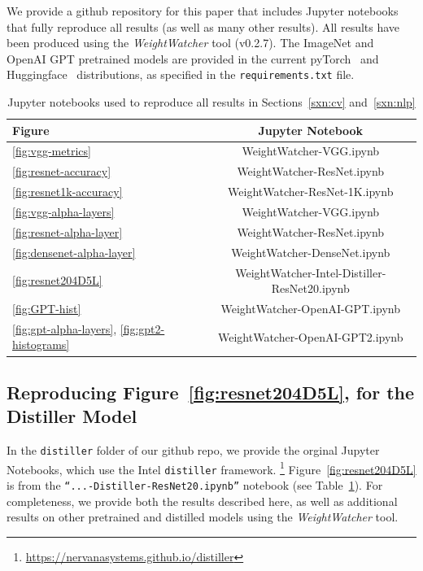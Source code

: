 We provide a github repository for this paper that includes Jupyter notebooks that fully reproduce all results (as well as many other results).
All results have been produced using the \emph{WeightWatcher} tool (v0.2.7).
The ImageNet and OpenAI GPT pretrained models are provided in the current 
pyTorch~\cite{pytorch} and Huggingface~\cite{huggingface} distributions, as specified in the \texttt{requirements.txt} file. 

\begin{table}[t]
\small
\begin{center}
\begin{tabular}{|p{1in}|c|}
\hline
Figure & Jupyter Notebook \\
\hline
\ref{fig:vgg-metrics}                                 & WeightWatcher-VGG.ipynb \\
\ref{fig:resnet-accuracy}                             & WeightWatcher-ResNet.ipynb \\
\ref{fig:resnet1k-accuracy}                           & WeightWatcher-ResNet-1K.ipynb \\
\ref{fig:vgg-alpha-layers}                            & WeightWatcher-VGG.ipynb \\
\ref{fig:resnet-alpha-layer}                          & WeightWatcher-ResNet.ipynb \\
\ref{fig:densenet-alpha-layer}                        & WeightWatcher-DenseNet.ipynb \\
\hline
\ref{fig:resnet204D5L}                                & WeightWatcher-Intel-Distiller-ResNet20.ipynb \\
\hline
\ref{fig:GPT-hist}                                    & WeightWatcher-OpenAI-GPT.ipynb \\
\ref{fig:gpt-alpha-layers}, \ref{fig:gpt2-histograms} & WeightWatcher-OpenAI-GPT2.ipynb \\
\hline
\end{tabular}
\end{center}
\caption{Jupyter notebooks used to reproduce all results in Sections~\ref{sxn:cv} and~\ref{sxn:nlp}}
\label{table:notebooks}
\end{table}


\subsection{Reproducing Figure~\ref{fig:resnet204D5L}, for the Distiller Model}

In the \texttt{distiller} folder of our github repo, 
we provide the orginal Jupyter Notebooks, which use the Intel \texttt{distiller} framework.%
\footnote{\url{https://nervanasystems.github.io/distiller}} 
Figure~\ref{fig:resnet204D5L} is from the  \texttt{``...-Distiller-ResNet20.ipynb''} notebook (see Table~\ref{table:notebooks}).  
For completeness, we provide both the results described here, as well as additional results on other pretrained and distilled models using the \emph{WeightWatcher} tool.


